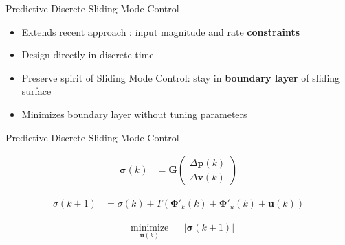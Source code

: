 \documentclass[]{beamer}
\newcommand{\mbf}[1]{\mathbf{#1}}
\providecommand{\mbf}[1]{\mathbf{#1}}
\newcommand{\idxSample}{{\ensuremath{k}}}
\begin{document}
\usebackgroundtemplate{
}

\begin{frame}{Predictive Discrete Sliding Mode Control}
\centering
\begin{tcolorbox}[colback=blue!5!white,colframe=blue!75!black,title=PDSMC]
\begin{itemize}
\item Extends recent approach \cite{houda2013new}: input magnitude and rate \textbf{constraints}
\item Design directly in discrete time
\item Preserve spirit of Sliding Mode Control: stay in \textbf{boundary layer} of sliding surface
\item Minimizes boundary layer without tuning parameters
\end{itemize}
\end{tcolorbox}
\end{frame}

\begin{frame}{Predictive Discrete Sliding Mode Control}
\centering
\begin{tcolorbox}[colback=blue!5!white,colframe=blue!75!black,title=What it looks like, width=.8\paperwidth]

\begin{align}
\mbf{\sigma}(\idxSample) &= \mbf{G}
\begin{pmatrix}
\Delta \mbf{p}(\idxSample)\\
\Delta \mbf{v}(\idxSample)
\end{pmatrix} \nonumber
\end{align}

\begin{align}
{{\sigma}}(\idxSample+1)
&=
{{\sigma}}(\idxSample)
+
T(
\mbf{\Phi}'_k(\idxSample) + \mbf{\Phi}'_u(\idxSample) + \mbf{u}(\idxSample))
\nonumber
\end{align}

\begin{align}
& \underset{\mbf{u}(\idxSample)}{\text{minimize}}
& & |\mbf{\sigma}(\idxSample+1)| \nonumber 
\end{align}

\end{tcolorbox}

\end{frame}
\end{document}
